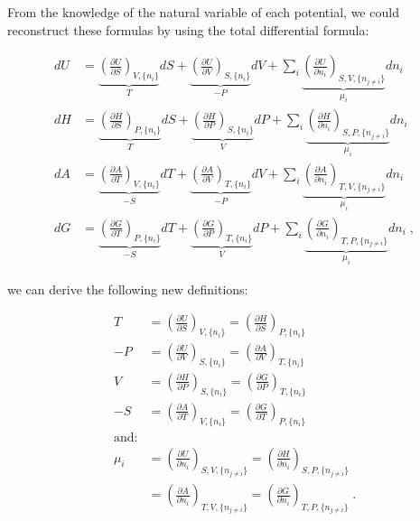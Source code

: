 \documentclass[
  9pt,
]{extbook}
\theoremstyle{definition}
\theoremstyle{definition}
\theoremstyle{definition}
\theoremstyle{definition}
\theoremstyle{remark}
\begin{document}
From the knowledge of the natural variable of each potential, we could reconstruct these formulas by using the total differential formula:

\begin{equation}
\begin{aligned}
dU &= \underbrace{\left(\frac{\partial U}{\partial S} \right)_{V,\{n_i\}}}_{T} dS + \underbrace{\left(\frac{\partial U}{\partial V} \right)_{S,\{n_i\}}}_{-P} dV + \sum_i \underbrace{\left(\frac{\partial U}{\partial n_i} \right)_{S,V,\{n_{j \neq i}\}}}_{\mu_i} dn_i \\
dH &= \underbrace{\left(\frac{\partial H}{\partial S} \right)_{P,\{n_i\}}}_{T} dS + \underbrace{\left(\frac{\partial H}{\partial P} \right)_{S,\{n_i\}}}_{V} dP + \sum_i \underbrace{\left(\frac{\partial H}{\partial n_i} \right)_{S,P,\{n_{j \neq i}\}}}_{\mu_i} dn_i \\
dA &= \underbrace{\left(\frac{\partial A}{\partial T} \right)_{V,\{n_i\}}}_{-S} dT + \underbrace{\left(\frac{\partial A}{\partial V} \right)_{T,\{n_i\}}}_{-P} dV + \sum_i \underbrace{\left(\frac{\partial A}{\partial n_i} \right)_{T,V,\{n_{j \neq i}\}}}_{\mu_i} dn_i \\
dG &= \underbrace{\left(\frac{\partial G}{\partial T} \right)_{P,\{n_i\}}}_{-S} dT + \underbrace{\left(\frac{\partial G}{\partial P} \right)_{T,\{n_i\}}}_{V} dP + \sum_i \underbrace{\left(\frac{\partial G}{\partial n_i} \right)_{T,P,\{n_{j \neq i}\}}}_{\mu_i} dn_i\;,
\end{aligned}
\label{eq:dhagchem2}
\end{equation}

we can derive the following new definitions:

\begin{equation}
\begin{aligned}
 T &= \left(\frac{\partial U}{\partial S} \right)_{V,\{n_i\}} = \left(\frac{\partial H}{\partial S} \right)_{P,\{n_i\}}  \\
-P &= \left(\frac{\partial U}{\partial V} \right)_{S,\{n_i\}} = \left(\frac{\partial A}{\partial V} \right)_{T,\{n_i\}}  \\
 V &= \left(\frac{\partial H}{\partial P} \right)_{S,\{n_i\}} = \left(\frac{\partial G}{\partial P} \right)_{T,\{n_i\}}  \\
-S &= \left(\frac{\partial A}{\partial T} \right)_{V,\{n_i\}} = \left(\frac{\partial G}{\partial T} \right)_{P,\{n_i\}}  \\
\text{and:}
\\
 \mu_i &=  \left(\frac{\partial U}{\partial n_i} \right)_{S,V,\{n_{j \neq i}\}} =  \left(\frac{\partial H}{\partial n_i} \right)_{S,P,\{n_{j \neq i}\}} \\
       &= \left(\frac{\partial A}{\partial n_i} \right)_{T,V,\{n_{j \neq i}\}} = \left(\frac{\partial G}{\partial n_i} \right)_{T,P,\{n_{j \neq i}\}}\;.
\end{aligned}
\label{eq:dhagchem3}
\end{equation}
\end{document}
